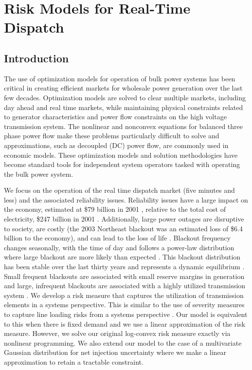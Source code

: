 \newcommand{\mypathjcc}{../thesis/jcc}
\newcommand{\mypathjccdata}{../thesis/jcc/data}

\chapter{Risk Models for Real-Time Dispatch}

\section{Introduction}

The use of optimization models for operation of bulk power systems has been critical in creating efficient markets for wholesale power generation over the last few decades.  Optimization models are solved to clear multiple markets, including day ahead and real time markets, while maintaining physical constraints related to generator characteristics and power flow constraints on the high voltage transmission system. The nonlinear and nonconvex equations for balanced three phase power flow make these problems particularly difficult to solve and approximations, such as decoupled (DC) power flow, are commonly used in economic models. 
These optimization models and solution methodologies have become standard tools for independent system operators tasked with operating the bulk power system.

We focus on the operation of the real time dispatch market (five minutes and less) and the associated reliability issues.  Reliability issues have a large impact on the economy, estimated at \$79 billion in 2001 \cite{lacommare_2006}, relative to the total cost of electricity, \$247 billion in 2001 \cite{eia_gov}.  Additionally, large power outages are disruptive to society, are costly (the 2003 Northeast blackout was an estimated loss of \$6.4 billion to the economy), and can lead to the loss of life \cite{northeast_2003}.  Blackout frequency changes seasonally, with the time of day and follows a power-law distribution where large blackout are more likely than expected \cite{hines_2009}.  This blackout distribution has been stable over the last thirty years and represents a dynamic equilibrium \cite{dobson_2007,hines_2009}.  Small frequent blackouts are associated with small reserve margins in generation and large, infrequent blackouts are associated with a highly utilized transmission system \cite{dobson_2007}.  We develop a risk measure that captures the utilization of transmission elements in a systems perspective.  This is similar to the use of severity measures to capture line loading risks from a systems perspective \cite{vrakopoulou_2013c,wang_2014,wang_2013}.  Our model is equivalent to this when there is fixed demand and we use a linear approximation of the risk measure.  However, we solve our original log-convex risk measure exactly via nonlinear programming. We also extend our model to the case of a multivariate Gaussian distribution for net injection uncertainty where we make a linear approximation to retain a tractable constraint.

